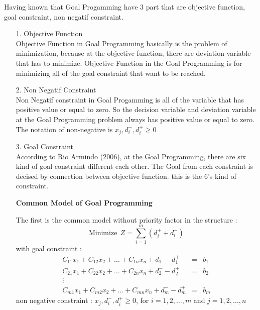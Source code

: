 \documentclass[a4paper, 12pt]{article}
\numberwithin{lemma}{section}
\begin{document}
	Having known that Goal Progamming have 3 part that are objective function, goal constraint, non negatif constraint. 
	\begin{itemize}
		\item[1. ] Objective Function\\
		Objective Function in Goal Programming basically is the problem of minimization, because at the objective function, there are deviation variable that has to minimize. Objective Function in the Goal Programming is for minimizing all of the goal constraint that want to be reached.
		
		\item[2. ] Non Negatif Constraint\\
		Non Negatif constraint in Goal Progamming is all of the variable that has positive value or equal to zero. So the decision variable and deviation variable at the Goal Programming problem always has positive value or equal to zero. The notation of non-negative is $x_j,d^-_i,d^+_i \geq 0$
		
		\item[3. ] Goal Constraint\\
		According to Rio Armindo (2006), at the Goal Programming, there are six kind of goal constraint different each other. The Goal from each constraint is decised by connection between objective function. this is the 6's kind of constraint.

		\textbf{Common Model of Goal Programming}
		
		The first is the common model without priority factor in the structure :
		\begin{equation*}
		\text{Minimize}~~ Z = \displaystyle\sum_{i=1}^{m} \left(d^+_i + d^-_i\right)
		\end{equation*}
		with goal constraint :
		\begin{equation*}
		\begin{array}{rcl}
		C_{11}x_1+C_{12}x_2 + \dots + C_{1n}x_n + d^-_1 - d^+_1&=&b_1\\
		C_{21}x_1+C_{22}x_2 + \dots + C_{2n}x_n + d^-_2- d^+_2&=&b_2\\
		\vdots&&\\
		C_{m1}x_1+C_{m2}x_2 + \dots + C_{mn}x_n + d^-_m - d^+_m&=&b_m
		\end{array}
		\end{equation*}
		non negative constraint : $x_j,d^-_i,d^+_i \geq 0$, for $i = 1,2,\dots,m$ and $j = 1,2,\dots,n$
		

\end{itemize}
\end{document}
